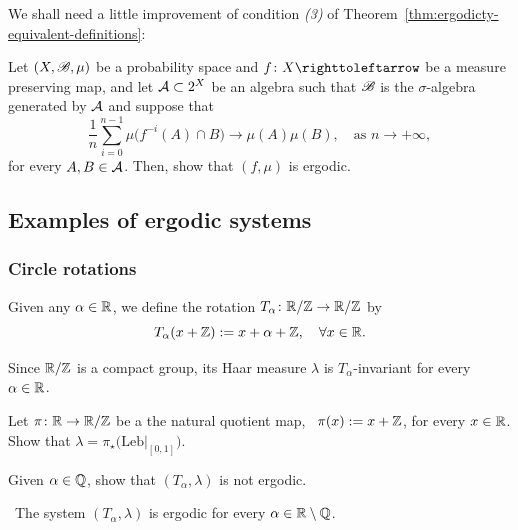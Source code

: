 We shall need a little improvement of condition \emph{(3)} of Theorem~\ref{thm:ergodicty-equivalent-definitions}:

\begin{exercise}
  \label{ex:ergodicity-algebra-implies-ergodicity}
  Let $(X,\mathscr{B},\mu)$ be a probability space and $f\colon X\carr$ be a measure preserving map, and let $\mathcal{A}\subset 2^{X}$ be an algebra such that $\mathscr{B}$ is the $\sigma$-algebra generated by $\mathcal{A}$ and suppose that
  \begin{displaymath}
    \frac{1}{n}\sum_{i=0}^{n-1}\mu\big(f^{-i}(A)\cap B\big) \to\mu(A)\mu(B), \quad\text{as } n\to+\infty,
  \end{displaymath}
  for every $A,B\in\mathcal{A}$. Then, show that $(f,\mu)$ is ergodic.
\end{exercise}



\subsection{Examples of ergodic systems}\label{sec:examples-ergodic-systems}

\subsubsection{Circle rotations}\label{sec:circle-rotations-ergodicity}

Given any $\alpha\in\mathbb{R}$, we define the rotation $T_{\alpha}\colon \mathbb{R}/\mathbb{Z}\to\mathbb{R}/\mathbb{Z}$ by
\begin{displaymath}
  T_{\alpha}(x+\mathbb{Z}) := x+\alpha +\mathbb{Z}, \quad\forall x\in\mathbb{R}.
\end{displaymath}

Since $\mathbb{R}/\mathbb{Z}$ is a compact group, its Haar measure $\lambda$ is $T_{\alpha}$-invariant for every $\alpha\in\mathbb{R}$.

\begin{exercise}
  Let $\pi\colon\mathbb{R}\to\mathbb{R}/\mathbb{Z}$ be a the natural quotient map, \ie~$\pi(x):=x+\mathbb{Z}$, for every $x\in\mathbb{R}$. Show that $\lambda=\pi_{\star}\Big(\mathrm{Leb}\big|_{[0,1]}\Big)$.
\end{exercise}

\begin{exercise}
  Given $\alpha\in\mathbb{Q}$, show that $(T_{\alpha},\lambda)$ is not ergodic.
\end{exercise}

\begin{theorem}\label{thm:ergodicity-irrational-circle-rotations}\
  The system $(T_{\alpha},\lambda)$ is ergodic for every $\alpha\in\mathbb{R}\setminus\mathbb{Q}$.
\end{theorem}

